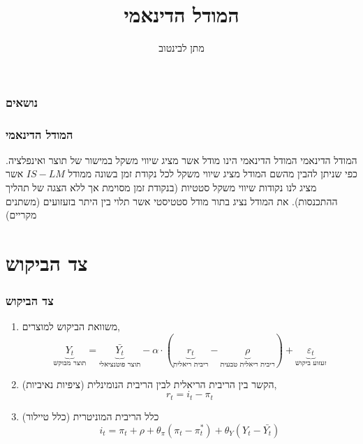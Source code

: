 \documentclass[usenames,dvipsnames]{beamer}
\title[]{המודל הדינאמי}
\author{מתן לבינטוב}
\institute[{{ אב"ג}}]{{ אוניברסיטת בן גוריון בנגב}}
\begin{document}
\begin{RTL}
\begin{frame}
\titlepage
\end{frame}
\begin{frame}
    \frametitle{נושאים}
    \tableofcontents

    

\end{frame}

\begin{frame}
    \frametitle{המודל הדינאמי}
    \begin{block}{המודל הדינאמי}
        המודל הדינאמי הינו מודל אשר מציג שיווי משקל במישור של תוצר ואינפלציה. כפי שניתן להבין מהשם המודל מציג שיווי
משקל לכל נקודת זמן בשונה ממודל $IS-LM$ אשר מציג לנו נקודות שיווי משקל סטטיות (בנקודת זמן מסוימת אך ללא
הצגה של תהליך ההתכנסות). את המודל נציג בתור מודל סטטיסטי אשר תלוי בין היתר בזעזועים (משתנים מקריים)
    \end{block}

    

\end{frame}

\section{צד הביקוש}
\begin{frame}[allowframebreaks]
    \frametitle{צד הביקוש}
    \begin{enumerate}
        \item משוואת הביקוש למוצרים,
        $$\underbrace{Y_t}_{\text{תוצר מבוקש}} = \underbrace{\bar{Y_t}}_{\text{תוצר פוטנציאלי}} - \alpha \cdot (\underbrace{r_t}_{\text{ריבית ריאלית}} - \underbrace{\rho}_{\text{ריבית ריאלית טבעית}}) + \underbrace{\varepsilon_t }_{\text{זעזוע ביקוש}}$$
        \item הקשר בין הריבית הריאלית לבין הריבית הנומינלית (ציפיות נאיביות),
        $$r_t = i_t - \pi_t$$
        \item כלל הריבית המוניטרית (כלל טיילור)
        $$i_t = \pi_t + \rho +\theta_\pi \left(\pi_t - \pi^*_t\right) + \theta_Y \left(Y_t - \bar{Y_t}\right)$$
    \end{enumerate}
    

\end{frame}
\end{RTL}
\end{document}
